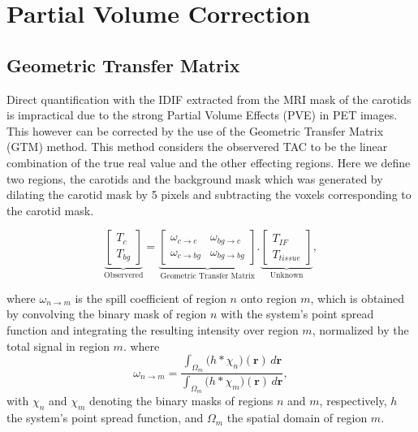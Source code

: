 \section{Partial Volume Correction}
\subsection{Geometric Transfer Matrix}
Direct quantification with the IDIF extracted from the MRI mask of the carotids is impractical due to the strong Partial Volume Effects (PVE) in PET images. %
This however can be corrected by the use of the Geometric Transfer Matrix (GTM) method. This method considers the observered TAC to be the linear combination of the true real value and the other effecting regions.
Here we define two regions, the carotids and the background mask which was generated by dilating the carotid mask by 5 pixels and subtracting the voxels corresponding to the carotid mask.

\begin{equation}
	\underbrace{
		\begin{bmatrix}
			T_{c} \\
			T_{bg}
		\end{bmatrix}
	}_{\text{Observered}}
	=
	\underbrace{
		\begin{bmatrix}
			\omega_{c \rightarrow c}  & \omega_{bg \rightarrow c}  \\
			\omega_{c \rightarrow bg} & \omega_{bg \rightarrow bg}
		\end{bmatrix}
	}_{\text{Geometric Transfer Matrix}}
	.
	\underbrace{
		\begin{bmatrix}
			T_{IF} \\
			T_{tissue}
		\end{bmatrix}
	}_{\text{Unknown}},
\end{equation}

where $\omega_{n \rightarrow m}$ is the spill coefficient of region $n$ onto region $m$, which is obtained by convolving the binary mask of region $n$ with the system's point spread function and integrating the resulting intensity over region $m$, normalized by the total signal in region $m$.
where
\begin{equation}
	\omega_{n\to m} = \frac{\displaystyle \int_{\Omega_m} \bigl( h \ast \chi_n \bigr)(\mathbf{r})\,d\mathbf{r}}{\displaystyle \int_{\Omega_m} \bigl( h \ast \chi_m \bigr)(\mathbf{r})\,d\mathbf{r}},
\end{equation}
with \(\chi_n\) and \(\chi_m\) denoting the binary masks of regions \(n\) and \(m\), respectively, \(h\) the system's point spread function, and \(\Omega_m\) the spatial domain of region \(m\).

